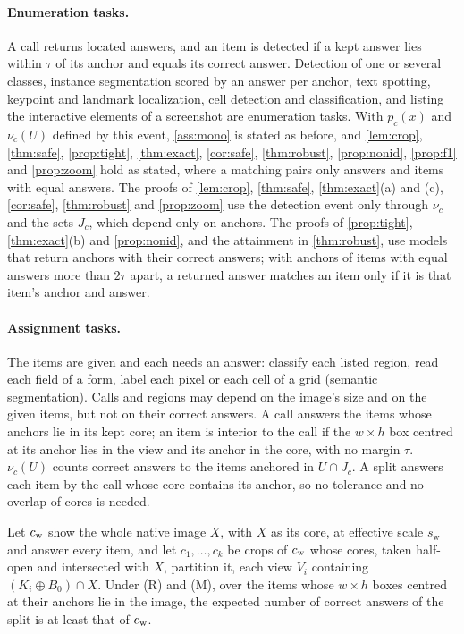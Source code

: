 \paragraph{Enumeration tasks.} A call returns located answers, and an item is detected if a kept answer lies within $\tau$ of its anchor and equals its correct answer. Detection of one or several classes, instance segmentation scored by an answer per anchor, text spotting, keypoint and landmark localization, cell detection and classification, and listing the interactive elements of a screenshot are enumeration tasks. With $p_c(x)$ and $\nu_c(U)$ defined by this event, \cref{ass:mono} is stated as before, and \cref{lem:crop}, \cref{thm:safe}, \cref{prop:tight}, \cref{thm:exact}, \cref{cor:safe}, \cref{thm:robust}, \cref{prop:nonid}, \cref{prop:f1} and \cref{prop:zoom} hold as stated, where a matching pairs only answers and items with equal answers. The proofs of \cref{lem:crop}, \cref{thm:safe}, \cref{thm:exact}(a) and (c), \cref{cor:safe}, \cref{thm:robust} and \cref{prop:zoom} use the detection event only through $\nu_c$ and the sets $J_c$, which depend only on anchors. The proofs of \cref{prop:tight}, \cref{thm:exact}(b) and \cref{prop:nonid}, and the attainment in \cref{thm:robust}, use models that return anchors with their correct answers; with anchors of items with equal answers more than $2\tau$ apart, a returned answer matches an item only if it is that item's anchor and answer.

\paragraph{Assignment tasks.} The items are given and each needs an answer: classify each listed region, read each field of a form, label each pixel or each cell of a grid (semantic segmentation). Calls and regions may depend on the image's size and on the given items, but not on their correct answers. A call answers the items whose anchors lie in its kept core; an item is interior to the call if the $w \times h$ box centred at its anchor lies in the view and its anchor in the core, with no margin $\tau$. $\nu_c(U)$ counts correct answers to the items anchored in $U \cap J_c$. A split answers each item by the call whose core contains its anchor, so no tolerance and no overlap of cores is needed.

\begin{theorem}
\label{thm:assign}
Let $c_{\mathrm{w}}$ show the whole native image $X$, with $X$ as its core, at effective scale $s_{\mathrm{w}}$ and answer every item, and let $c_1, \dots, c_k$ be crops of $c_{\mathrm{w}}$ whose cores, taken half-open and intersected with $X$, partition it, each view $V_i$ containing $(K_i \oplus B_0) \cap X$. Under (R) and (M), over the items whose $w \times h$ boxes centred at their anchors lie in the image, the expected number of correct answers of the split is at least that of $c_{\mathrm{w}}$.
\end{theorem}


